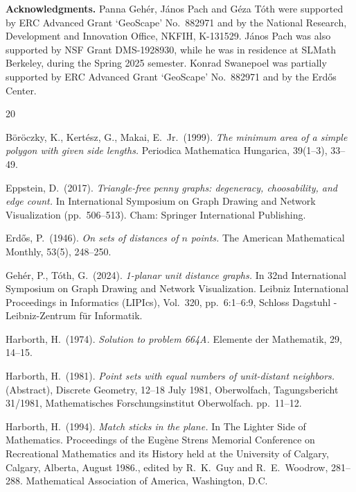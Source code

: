 \documentclass[12pt]{article}
\theoremstyle{plain}
\theoremstyle{definition}
\theoremstyle{remark}
\begin{document}
\vspace{5mm}

\noindent
{\bf \large Acknowledgments.}
Panna Geh\'er, J\'anos Pach and G\'eza T\'oth were supported by ERC Advanced Grant `GeoScape' No.\ 882971 and by the National Research, Development and Innovation Office, NKFIH, K-131529. J\'anos Pach was also supported by NSF Grant DMS-1928930, while he was in residence at SLMath Berkeley, during the Spring 2025 semester.
Konrad Swanepoel was partially supported by ERC Advanced Grant `GeoScape' No.\ 882971 and by the Erd\H os Center.


\begin{thebibliography}{20}

B\"or\"oczky, K., Kert\'esz, G., Makai, E.\ Jr.\ (1999).
\emph{The minimum area of a simple polygon with given side lengths.}
Periodica Mathematica Hungarica, 39(1--3), 33--49.


Eppstein, D.\ (2017).
\emph{Triangle-free penny graphs: degeneracy, choosability, and edge count.}
In International Symposium on Graph Drawing and Network Visualization (pp.\ 506--513). Cham: Springer International Publishing.

Erd\H{o}s, P.\ (1946).
\emph{On sets of distances of $n$ points.}
The American Mathematical Monthly, 53(5), 248--250.


Geh\'er, P., T\'oth, G.\ (2024).
\emph{1-planar unit distance graphs.}
In 32nd International Symposium on Graph Drawing and Network Visualization. Leibniz International Proceedings in Informatics (LIPIcs), Vol.\ 320, pp.\ 6:1--6:9, Schloss Dagstuhl - Leibniz-Zentrum für Informatik.

Harborth, H.\ (1974).
\emph{Solution to problem 664A.}
Elemente der Mathematik, 29, 14--15.

Harborth, H.\ (1981).
\emph{Point sets with equal numbers of unit-distant neighbors.}
(Abstract),
Discrete Geometry, 12--18 July 1981, Oberwolfach,
Tagungsbericht 31/1981, Mathematisches Forschungsinstitut Oberwolfach. pp.~11--12.

Harborth, H.\ (1994).
\emph{Match sticks in the plane.}
In The Lighter Side of Mathematics.
Proceedings of the Eug\`ene Strens Memorial Conference on Recreational Mathematics and its History held at the University of Calgary, Calgary, Alberta, August 1986., edited by R.\ K.\ Guy and R.\ E.\ Woodrow, 281--288. Mathematical Association of America, Washington, D.C.


\end{thebibliography}
\end{document}
